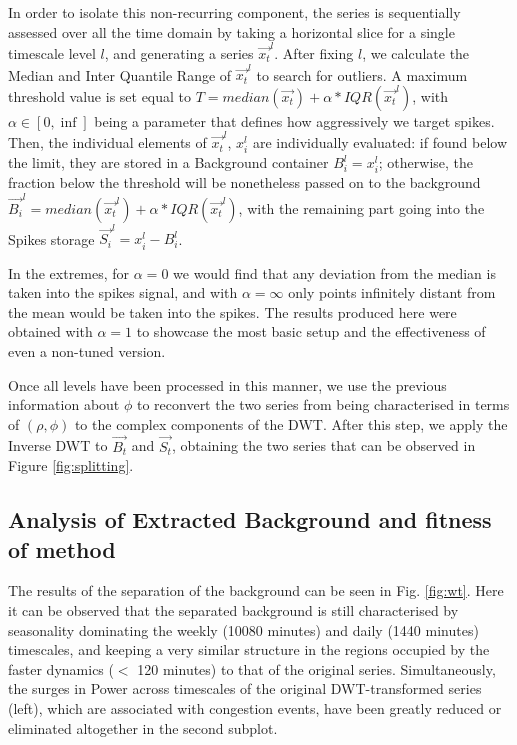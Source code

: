 \documentclass[a4paper, 10pt, conference]{ieeeconf}      %
\begin{document}
In order to isolate this non-recurring component, the series is sequentially assessed over all the time domain by taking a horizontal slice for a single timescale level $l$, and generating a series $\vec{x_{t}}^l$.
After fixing $l$, we calculate the Median and Inter Quantile Range of $\vec{x_{t}}^l$ to search for outliers.
A maximum threshold value is set equal to $T = median(\vec{x_t}) + \alpha * IQR(\vec{x_{t}}^l)$, with $\alpha \in [0,\inf]$ being a parameter that defines how aggressively we target spikes. 
Then, the individual elements of $\vec{x_{t}}^l$, $x_{i}^l$ are individually evaluated: if found below the limit, they are stored in a Background container $B_i^l = x_{i}^l$; otherwise, the fraction below the threshold will be nonetheless passed on to the background $\vec{B_i}^l = median(\vec{x_{t}}^l) + \alpha * IQR(\vec{x_{t}}^l)$, with the remaining part going into the Spikes storage $\vec{S_i}^l = x_{i}^l - B_{i}^l$.

In the extremes, for $\alpha = 0$ we would find that any deviation from the median is taken into the spikes signal, and with $\alpha = \infty$ only points infinitely distant from the mean would be taken into the spikes.
The results produced here were obtained with $\alpha=1$ to showcase the most basic setup and the effectiveness of even a non-tuned version.

Once all levels have been processed in this manner, we use the previous information about $\phi$ to reconvert the two series from being characterised in terms of $(\rho, \phi)$ to the complex components of the DWT.
After this step, we apply the Inverse DWT to $\vec{B_t}$ and $\vec{S_t}$, obtaining the two series that can be observed in Figure \ref{fig:splitting}.
\subsection{Analysis of Extracted Background and fitness of method}
The results of the separation of the background can be seen in Fig. \ref{fig:wt}. Here it can be observed that the separated background is still characterised by seasonality dominating the weekly (10080 minutes) and daily (1440 minutes) timescales, and keeping a very similar structure in the regions occupied by the faster dynamics ($<$ 120 minutes) to that of the original series.
Simultaneously, the surges in Power across timescales of the original DWT-transformed series (left), which are associated with congestion events, have been greatly reduced or eliminated altogether in the second subplot.
\end{document}
